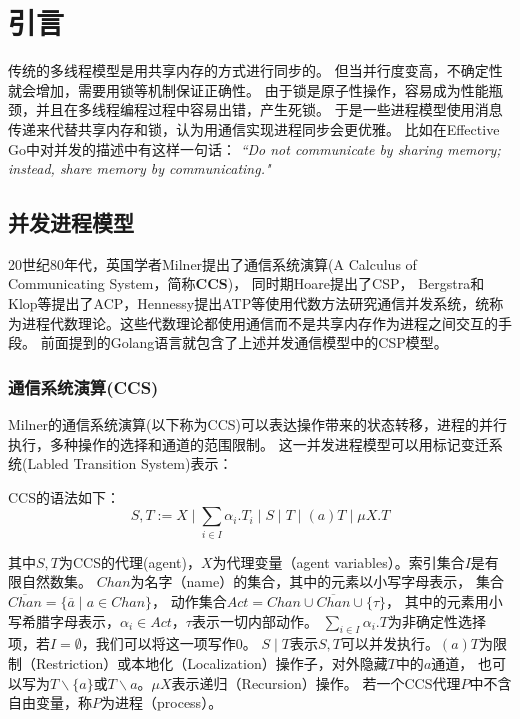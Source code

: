 
\chapter{引言}
   传统的多线程模型是用共享内存的方式进行同步的。
   但当并行度变高，不确定性就会增加，需要用锁等机制保证正确性。
   由于锁是原子性操作，容易成为性能瓶颈，并且在多线程编程过程中容易出错，产生死锁。
   于是一些进程模型使用消息传递来代替共享内存和锁，认为用通信实现进程同步会更优雅。
   比如在Effective Go中对并发的描述中有这样一句话：
   \textit{“Do not communicate by sharing memory; instead, share memory by communicating."}\cite{1}


   \section{并发进程模型}
   20世纪80年代，英国学者Milner提出了通信系统演算(A Calculus of Communicating System，简称\textbf{CCS})\cite{2}，
   同时期Hoare提出了CSP\cite{3}，
   Bergstra和Klop等提出了ACP\cite{4}，Hennessy提出ATP\cite{5}等使用代数方法研究通信并发系统，统称为进程代数理论。这些代数理论都使用通信而不是共享内存作为进程之间交互的手段。
   前面提到的Golang语言就包含了上述并发通信模型中的CSP模型。

   \subsection{通信系统演算(CCS)}
   Milner的通信系统演算(以下称为CCS)可以表达操作带来的状态转移，进程的并行执行，多种操作的选择和通道的范围限制。
   这一并发进程模型可以用标记变迁系统(Labled Transition System)表示：

   CCS的语法如下：
   $$S,T:=X\mid \sum_{i\in I}\alpha_i.T_i\mid S\mid T \mid (a)T \mid \mu X.T$$

   其中$S,T$为CCS的代理(agent)，$X$为代理变量（agent variables）。索引集合$I$是有限自然数集。
   $Chan$为名字（name）的集合，其中的元素以小写字母表示，
   集合$\overline{Chan}=\{\overline{a}\mid a\in Chan\}$，
   动作集合$Act=Chan\cup \overline{Chan}\cup \{\tau\} $，
   其中的元素用小写希腊字母表示，$\alpha_i\in Act$，$\tau$表示一切内部动作。
   $\sum_{i\in I}\alpha_i.T$为非确定性选择项，若$I=\emptyset$，我们可以将这一项写作$0$。
   $S\mid T$表示$S,T$可以并发执行。$(a)T$为限制（Restriction）或本地化（Localization）操作子，对外隐藏$T$中的$a$通道，
   也可以写为$T\backslash \{a\}$或$T\backslash a$。$\mu X$表示递归（Recursion）操作。
   若一个CCS代理$P$中不含自由变量，称$P$为进程（process）。

